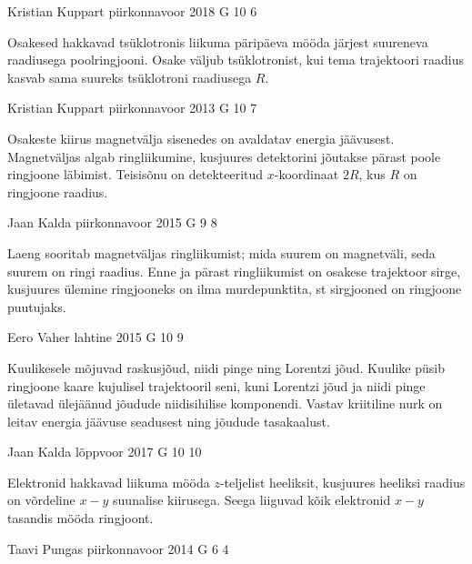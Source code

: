 \documentclass[11pt]{article}
\begin{document}
{%
{Kristian Kuppart} %
{piirkonnavoor} %
{2018} %
{G 10} %
{6} %
{

\ifHint
Osakesed hakkavad tsüklotronis liikuma päripäeva mööda järjest suureneva raadiusega poolringjooni. Osake väljub tsüklotronist, kui tema trajektoori raadius kasvab sama suureks tsüklotroni raadiusega $R$.
\fi
}

{Kristian Kuppart} %
{piirkonnavoor} %
{2013} %
{G 10} %
{7} %
{

\ifHint
Osakeste kiirus magnetvälja sisenedes on avaldatav energia jäävusest. Magnetväljas algab ringliikumine, kusjuures detektorini jõutakse pärast poole ringjoone läbimist. Teisisõnu on detekteeritud $x$-koordinaat $2R$, kus $R$ on ringjoone raadius.
\fi
}

{Jaan Kalda} %
{piirkonnavoor} %
{2015} %
{G 9} %
{8} %
{

\ifHint
Laeng sooritab magnetväljas ringliikumist; mida suurem on magnetväli, seda suurem on ringi raadius. Enne ja pärast ringliikumist on osakese trajektoor sirge, kusjuures ülemine ringjooneks on ilma murdepunktita, st sirgjooned on ringjoone puutujaks.
\fi
}

{Eero Vaher} %
{lahtine} %
{2015} %
{G 10} %
{9} %
{

\ifHint
Kuulikesele mõjuvad raskusjõud, niidi pinge ning Lorentzi jõud. Kuulike püsib ringjoone kaare kujulisel trajektooril seni, kuni Lorentzi jõud ja niidi pinge ületavad ülejäänud jõudude niidisihilise komponendi. Vastav kriitiline nurk on leitav energia jäävuse seadusest ning jõudude tasakaalust.
\fi
}

{Jaan Kalda} %
{lõppvoor} %
{2017} %
{G 10} %
{10} %
{

\ifHint
Elektronid hakkavad liikuma mööda $z$-teljelist heeliksit, kusjuures heeliksi raadius on võrdeline $x-y$ suunalise kiirusega. Seega liiguvad kõik elektronid $x-y$ tasandis mööda ringjoont.
\fi
}

{Taavi Pungas} %
{piirkonnavoor} %
{2014} %
{G 6} %
{4} %
{

}}
\end{document}
